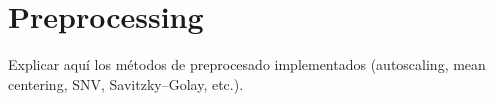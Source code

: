 \section{Preprocessing}
\label{sec:preprocesamiento}

Explicar aquí los métodos de preprocesado implementados (autoscaling, mean centering, SNV, Savitzky--Golay, etc.).

